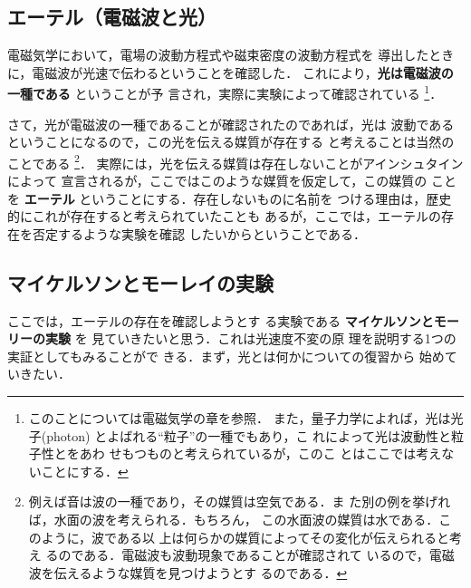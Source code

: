         \subsection{エーテル（電磁波と光）}
            電磁気学において，電場の波動方程式や磁束密度の波動方程式を
            導出したときに，電磁波が光速で伝わるということを確認した．
            これにより，\textbf{光は電磁波の一種である} ということが予
            言され，実際に実験によって確認されている
                \footnote{
                    このことについては電磁気学の章を参照．
                    また，量子力学によれば，光は光子(photon)
                    とよばれる“粒子”の一種でもあり，こ
                    れによって光は波動性と粒子性とをあわ
                    せもつものと考えられているが，このこ
                    とはここでは考えないことにする．
                }．

            さて，光が電磁波の一種であることが確認されたのであれば，光は
            波動であるということになるので，この光を伝える媒質が存在する
            と考えることは当然のことである
                \footnote{
                    例えば音は波の一種であり，その媒質は空気である．ま
                    た別の例を挙げれば，水面の波を考えられる．もちろん，
                    この水面波の媒質は水である．このように，波である以
                    上は何らかの媒質によってその変化が伝えられると考え
                    るのである．電磁波も波動現象であることが確認されて
                    いるので，電磁波を伝えるような媒質を見つけようとす
                    るのである．
                }．
            実際には，光を伝える媒質は存在しないことがアインシュタインによって
            宣言されるが，ここではこのような媒質を仮定して，この媒質の
            ことを \textbf{エーテル} ということにする．存在しないものに名前を
            つける理由は，歴史的にこれが存在すると考えられていたことも
            あるが，ここでは，エーテルの存在を否定するような実験を確認
            したいからということである．

        \subsection{マイケルソンとモーレイの実験}
            \begin{mycomment}
                ここでは，エーテルの存在を確認しようとす
                る実験である \textbf{マイケルソンとモーリーの実験} を
                見ていきたいと思う．これは光速度不変の原
                理を説明する1つの実証としてもみることがで
                きる．まず，光とは何かについての復習から
                始めていきたい．
            \end{mycomment}

